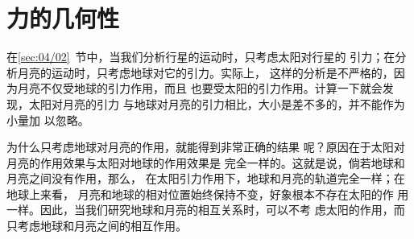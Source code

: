 \section{力的几何性}\label{sec:04.06}

在\ref{sec:04/02}~节中，当我们分析行星的运动时，只考虑太阳对行星的
引力；在分析月亮的运动时，只考虑地球对它的引力。实际上，
这样的分析是不严格的，因为月亮不仅受地球的引力作用，而且
也要受太阳的引力作用。计算一下就会发现，太阳对月亮的引力
与地球对月亮的引力相比，大小是差不多的，并不能作为小量加
以忽略。

为什么只考虑地球对月亮的作用，就能得到非常正确的结果
呢？原因在于太阳对月亮的作用效果与太阳对地球的作用效果是
完全一样的。这就是说，倘若地球和月亮之间没有作用，那么，
在太阳引力作用下，地球和月亮的轨道完全一样；在地球上来看，
月亮和地球的相对位置始终保持不变，好象根本不存在太阳的作
用一样。因此，当我们研究地球和月亮的相互关系时，可以不考
虑太阳的作用，而只考虑地球和月亮之间的相互作用。

